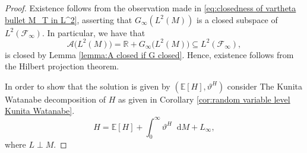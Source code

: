 \documentclass[11pt,a4paper,twoside,openany]{report}
\numberwithin{equation}{section}
\newcommand{\diff}{\mathop{}\!\mathrm{d}}
\theoremstyle{plain} %
\theoremstyle{definition} %
\theoremstyle{remark} %
\begin{document}
\begin{proof}
    Existence follows from  the observation made in \eqref{eq:closedness of vartheta bullet M_T in L^2}, asserting that \(G_{\infty}(L^2(M))\) is a closed subspace of \(L^2(\mathcal{F}_{\infty})\). In particular, we have that  
    \begin{equation*}
        \mathcal{A}\big(L^2(M)\big)=\mathbb{R}+G_{\infty}\big(L^2(M)\big)\subseteq L^2(\mathcal{F}_{\infty}),
    \end{equation*}
    is closed by Lemma \ref{lemma:A closed if G closed}. Hence, existence follows from the Hilbert projection theorem.

    In order to show that the solution is given by \((\mathbb{E}[H],\vartheta^H)\) consider The Kunita Watanabe decomposition of \(H\) as given in Corollary \ref{cor:random variable level Kunita Watanabe}. 
 \begin{equation}\label{eq:KW of liability H}
    H=\mathbb{E}[H]+\int_0^{\infty}\vartheta^H\diff M+L_{\infty} ,
 \end{equation}
 where \(L\perp M\). 



\end{proof}
\end{document}

